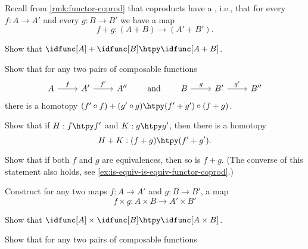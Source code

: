 \begin{exercises}
\begin{subexenum}
\begin{equation*}
    \end{equation*}
  \end{subexenum}
  \exitem \label{ex:coproduct_functor}Recall from \cref{rmk:functor-coprod} that coproducts have a , i.e., that for every $f:A\to A'$ and every $g:B\to B'$ we have a map
  \begin{equation*}
    f+g:(A+B)\to (A'+B').
  \end{equation*}
  \begin{subexenum}
  \item Show that $\idfunc[A]+\idfunc[B]\htpy \idfunc[A+B]$.
  \item Show that for any two pairs of composable functions
    \begin{equation*}
      \begin{tikzcd}
        A \arrow[r,"f"] & {A'} \arrow[r,"{f'}"] & {A''}
      \end{tikzcd}
      \qquad\text{and}\qquad
      \begin{tikzcd}
        B \arrow[r,"g"] & {B'} \arrow[r,"{g'}"] & {B''}
      \end{tikzcd}
    \end{equation*}
    there is a homotopy $(f'\circ f)+(g'\circ g) \htpy (f'+g')\circ (f+g)$.
  \item Show that if $H:f\htpy f'$ and $K:g\htpy g'$, then there is a homotopy
    \begin{equation*}
      H+K:(f+g)\htpy (f'+g').
    \end{equation*}
  \item \label{ex:coproduct_functor_equivalence}Show that if both $f$ and $g$ are equivalences, then so is $f+g$. (The converse of this statement also holds, see \cref{ex:is-equiv-is-equiv-functor-coprod}.)
  \end{subexenum}
  \exitem
  \begin{subexenum}
  \item Construct for any two maps $f:A \to A'$ and $g:B\to B'$, a map
    \begin{equation*}
      f\times g : A\times B \to A'\times B'
    \end{equation*}
  \item Show that $\idfunc[A]\times\idfunc[B]\htpy\idfunc[A\times B]$.
  \item Show that for any two pairs of composable functions
    \begin{equation*}
      \begin{tikzcd}

\end{tikzcd}
\end{equation*}
\end{subexenum}
\end{exercises}
